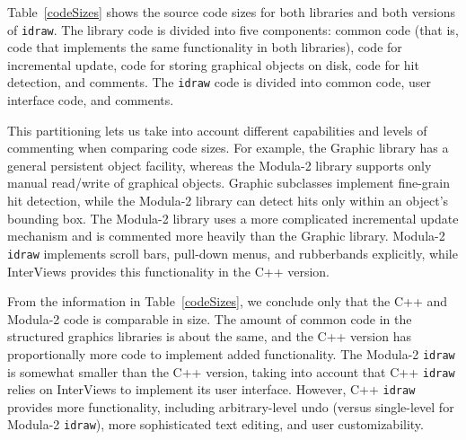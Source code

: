 Table~\ref{codeSizes} shows the source code sizes for both libraries and
both versions of {\tt idraw}.  The library code is divided into five
components: common code (that is, code that implements the same
functionality in both libraries), code for incremental update, code for
storing graphical objects on disk, code for hit detection, and comments.
The {\tt idraw} code is divided into common code, user interface code, and
comments.

This partitioning lets us take into account different capabilities and
levels of commenting when comparing code sizes.  For example, the Graphic
library has a general persistent object facility, whereas the
\mbox{Modula-2} library supports only manual read/write of graphical
objects.  Graphic subclasses implement fine-grain hit detection, while the
\mbox{Modula-2} library can detect hits only within an object's bounding
box.  The \mbox{Modula-2} library uses a more complicated incremental update
mechanism and is commented more heavily than the Graphic library.
\mbox{Modula-2} {\tt idraw} implements scroll bars, pull-down menus, and
rubberbands explicitly, while InterViews provides this functionality in the
C++ version.

From the information in Table~\ref{codeSizes}, we conclude only that the C++
and \mbox{Modula-2} code is comparable in size.  The amount of common
code in the structured graphics libraries is about the same, and the
C++ version has proportionally more code to implement added functionality.
The \mbox{Modula-2} {\tt idraw} is somewhat smaller than the C++ version,
taking into account that C++ {\tt idraw} relies on InterViews to implement
its user interface.  However, C++ {\tt idraw} provides more
functionality, including arbitrary-level undo (versus single-level for
\mbox{Modula-2} {\tt idraw}), more sophisticated text editing, and user
customizability.

